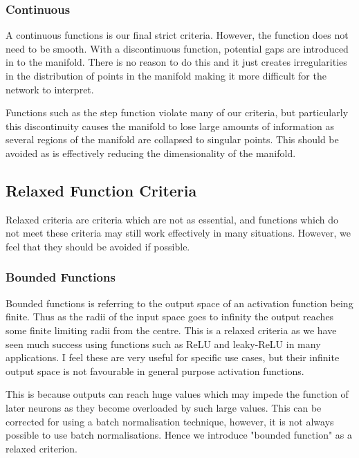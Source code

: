 \documentclass[onecolumn]{article}
\begin{document}
    \subsubsection{Continuous}
    
    A continuous functions is our final strict criteria. However, the function does not need to be smooth. With a discontinuous function, potential gaps are introduced in to the manifold. There is no reason to do this and it just creates irregularities in the distribution of points in the manifold making it more difficult for the network to interpret.
    
    Functions such as the step function violate many of our criteria, but particularly this discontinuity causes the manifold to lose large amounts of information as several regions of the manifold are collapsed to singular points. This should be avoided as is effectively reducing the dimensionality of the manifold.


    \subsection{Relaxed Function Criteria}
        
    Relaxed criteria are criteria which are not as essential, and functions which do not meet these criteria may still work effectively in many situations. However, we feel that they should be avoided if possible.
        
    \subsubsection{Bounded Functions}
        
    Bounded functions is referring to the output space of an activation function being finite. Thus as the radii of the input space goes to infinity the output reaches some finite limiting radii from the centre. This is a relaxed criteria as we have seen much success using functions such as ReLU and leaky-ReLU in many applications. I feel these are very useful for specific use cases, but their infinite output space is not favourable in general purpose activation functions.
    
    This is because outputs can reach huge values which may impede the function of later neurons as they become overloaded by such large values. This can be corrected for using a batch normalisation technique, however, it is not always possible to use batch normalisations. Hence we introduce "bounded function" as a relaxed criterion.
       
\end{document}
